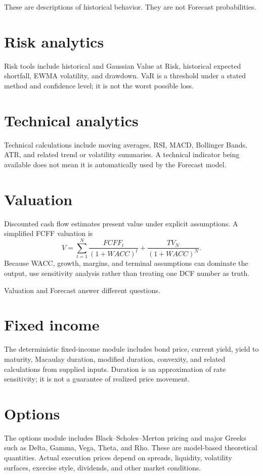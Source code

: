 \documentclass[11pt]{article}
\begin{document}
These are descriptions of historical behavior. They are not Forecast probabilities.

\section{Risk analytics}
Risk tools include historical and Gaussian Value at Risk, historical expected shortfall, EWMA volatility, and drawdown. VaR is a threshold under a stated method and confidence level; it is not the worst possible loss.

\section{Technical analytics}
Technical calculations include moving averages, RSI, MACD, Bollinger Bands, ATR, and related trend or volatility summaries. A technical indicator being available does not mean it is automatically used by the Forecast model.

\section{Valuation}
Discounted cash flow estimates present value under explicit assumptions. A simplified FCFF valuation is
\begin{equation}
V=\sum_{t=1}^{N}\frac{FCFF_t}{(1+WACC)^t}+\frac{TV_N}{(1+WACC)^N}.
\end{equation}
Because WACC, growth, margins, and terminal assumptions can dominate the output, use sensitivity analysis rather than treating one DCF number as truth.

Valuation and Forecast answer different questions.

\section{Fixed income}
The deterministic fixed-income module includes bond price, current yield, yield to maturity, Macaulay duration, modified duration, convexity, and related calculations from supplied inputs. Duration is an approximation of rate sensitivity; it is not a guarantee of realized price movement.

\section{Options}
The options module includes Black--Scholes--Merton pricing and major Greeks such as Delta, Gamma, Vega, Theta, and Rho. These are model-based theoretical quantities. Actual execution prices depend on spreads, liquidity, volatility surfaces, exercise style, dividends, and other market conditions.
\end{document}
